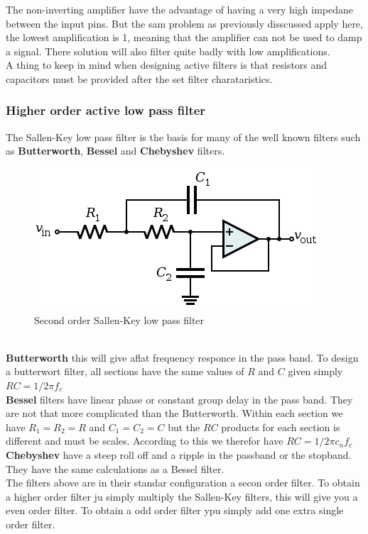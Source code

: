 \documentclass[12pt,a4paper]{article}
\begin{document}
    The non-inverting amplifier have the advantage of having a very high
    impedane between the input pins. But the sam problem as previously
    disscussed apply here, the lowest amplification is 1, meaning that
    the amplifier can not be used to damp a signal. There solution will
    also filter quite badly with low amplifications. \\
    A thing to keep in mind when designing active filters is that
    resistors and capacitors must be provided after the set filter
    charataristics.

    \subsubsection{Higher order active low pass filter}
    The Sallen-Key low pass filter is the basis for many of the well
    known filters such as \textbf{Butterworth}, \textbf{Bessel} and
    \textbf{Chebyshev} filters.
    \begin{figure}[!h]
      \begin{center}
        \includegraphics[scale=0.5]{sallenKey}
        \caption{Second order Sallen-Key low pass filter}
        \label{fig:sallenKey}
      \end{center}
    \end{figure}\\
    \textbf{Butterworth} this will give aflat frequency responce in the
    pass band. To design a butterwort filter, all sections
    have the same values of $R$ and $C$ given simply $RC=1/2\pi f_c$\\
    \textbf{Bessel} filters have linear phase or
    constant group delay in the pass band. They are not that more complicated
    than the Butterworth. Within each section we have $R_1=R_2=R$ and
    $C_1=C_2=C$ but the $RC$ products for each section is different and
    must be scales. According to this we therefor have $RC=1/2\pi
    c_nf_c$\\
    \textbf{Chebyshev} have a steep roll off and a ripple in the
    passband or the stopband. They have the same calculations as a
    Bessel filter. \\
    The filters above are in their standar configuration a secon order
    filter. To obtain a higher order filter ju simply multiply the
    Sallen-Key filters, this will give you a even order filter. To
    obtain a odd order filter ypu simply add one extra single order
    filter. 
\end{document}
